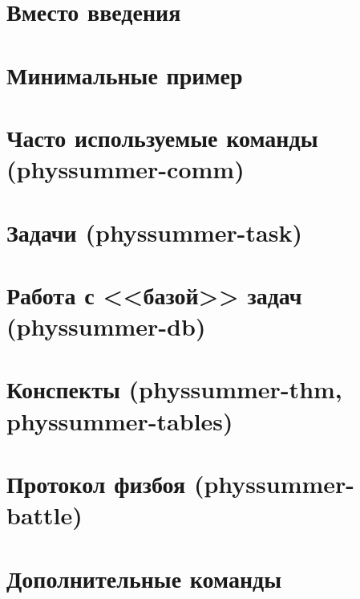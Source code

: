 



\section*{Вместо введения}






\section{Минимальные пример}



\section{Часто используемые команды (physsummer-comm)}




\section{Задачи (physsummer-task)}



\section{Работа с <<базой>> задач (physsummer-db)}



\section{Конспекты (physsummer-thm, physsummer-tables)}



\section{Протокол физбоя (physsummer-battle)}





\section{Дополнительные команды}





